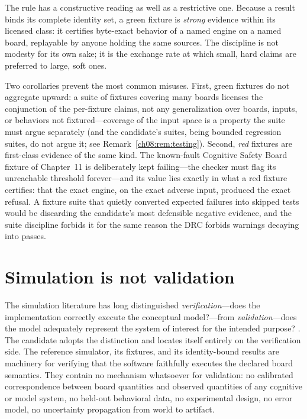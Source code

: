 The rule has a constructive reading as well as a restrictive one. Because a result binds its complete identity set, a green fixture is \emph{strong} evidence within its licensed class: it certifies byte-exact behavior of a named engine on a named board, replayable by anyone holding the same sources. The discipline is not modesty for its own sake; it is the exchange rate at which small, hard claims are preferred to large, soft ones.

Two corollaries prevent the most common misuses. First, green fixtures do not aggregate upward: a suite of fixtures covering many boards licenses the conjunction of the per-fixture claims, not any generalization over boards, inputs, or behaviors not fixtured---coverage of the input space is a property the suite must argue separately (and the candidate's suites, being bounded regression suites, do not argue it; see Remark~\ref{ch08:rem:testing}). Second, \emph{red} fixtures are first-class evidence of the same kind. The known-fault Cognitive Safety Board fixture of Chapter~11 is deliberately kept failing---the checker must flag its unreachable threshold forever---and its value lies exactly in what a red fixture certifies: that the exact engine, on the exact adverse input, produced the exact refusal. A fixture suite that quietly converted expected failures into skipped tests would be discarding the candidate's most defensible negative evidence, and the suite discipline forbids it for the same reason the DRC forbids warnings decaying into passes.

\section{Simulation is not validation}\label{ch08:sec:validationdist}

The simulation literature has long distinguished \emph{verification}---does the implementation correctly execute the conceptual model?---from \emph{validation}---does the model adequately represent the system of interest for the intended purpose? \cite{sargent}. The candidate adopts the distinction and locates itself entirely on the verification side. The reference simulator, its fixtures, and its identity-bound results are machinery for verifying that the software faithfully executes the declared board semantics. They contain no mechanism whatsoever for validation: no calibrated correspondence between board quantities and observed quantities of any cognitive or model system, no held-out behavioral data, no experimental design, no error model, no uncertainty propagation from world to artifact.

